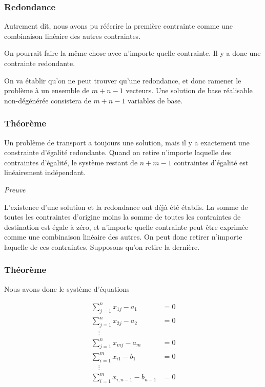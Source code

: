 \documentclass[usepdftitle=false, aspectratio=169]{beamer}
\begin{document}
\begin{frame}
\frametitle{Redondance}

Autrement dit, nous avons pu réécrire la première contrainte comme une combinaison linéaire des autres contraintes.

\mbox{}

On pourrait faire la même chose avec n'importe quelle contrainte. Il y a donc une contrainte redondante.

\mbox{}

On va établir qu'on ne peut trouver qu'une redondance, et donc ramener le problème à un ensemble de $m + n - 1$ vecteurs. Une solution de base réalisable non-dégénérée consistera de $m + n -1$ variables de base.

\end{frame}

\begin{frame}
\frametitle{Théorème}

Un problème de transport a toujours une solution, mais il y a exactement une constrainte d'égalité redondante.
Quand on retire n'importe laquelle des contraintes d'égalité, le système restant de $n+m-1$ contraintes d'égalité est linéairement indépendant.

\mbox{}

\emph{Preuve}

\mbox{}

L'existence d'une solution et la redondance ont déjà été établis.
La somme de toutes les contraintes d'origine moins la somme de toutes les contraintes de destination est égale à zéro, et n'importe quelle contrainte peut être exprimée comme une combinaison linéaire des autres. On peut donc retirer n'importe laquelle de ces contraintes. Supposons qu'on retire la dernière.

\end{frame}

\begin{frame}
\frametitle{Théorème}

Nous avons donc le système d'équations
\begin{footnotesize}
\begin{align*}
\sum_{j = 1}^n x_{1j} - a_1 & = 0  \\
\sum_{j = 1}^n x_{2j} - a_2 & = 0  \\
\quad \vdots & \\
\sum_{j = 1}^n x_{mj} - a_m & = 0  \\
\sum_{i = 1}^m x_{i1} - b_1 & = 0  \\
\quad \vdots & \\
\sum_{i = 1}^m x_{i,{n-1}} - b_{n-1} & = 0
\end{align*}
\end{footnotesize}

\end{frame}
\end{document}
